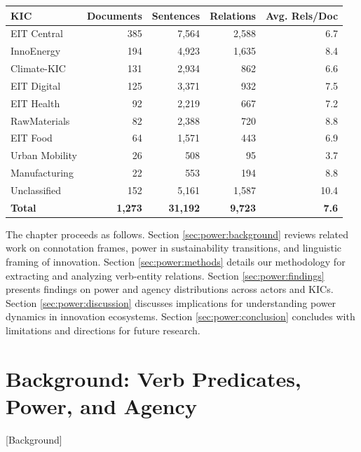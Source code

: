 \documentclass[../main.tex]{subfiles}
\begin{document}
\begin{center}
\small
\begin{tabular}{lrrrr}
\toprule
\textbf{KIC} & \textbf{Documents} & \textbf{Sentences} & \textbf{Relations} & \textbf{Avg. Rels/Doc} \\
\midrule
EIT Central & 385 & 7,564 & 2,588 & 6.7 \\
InnoEnergy & 194 & 4,923 & 1,635 & 8.4 \\
Climate-KIC & 131 & 2,934 & 862 & 6.6 \\
EIT Digital & 125 & 3,371 & 932 & 7.5 \\
EIT Health & 92 & 2,219 & 667 & 7.2 \\
RawMaterials & 82 & 2,388 & 720 & 8.8 \\
EIT Food & 64 & 1,571 & 443 & 6.9 \\
Urban Mobility & 26 & 508 & 95 & 3.7 \\
Manufacturing & 22 & 553 & 194 & 8.8 \\
Unclassified & 152 & 5,161 & 1,587 & 10.4 \\
\midrule
\textbf{Total} & \textbf{1,273} & \textbf{31,192} & \textbf{9,723} & \textbf{7.6} \\
\bottomrule
\end{tabular}
\end{center}

The chapter proceeds as follows. Section \ref{sec:power:background} reviews related work on connotation frames, power in sustainability transitions, and linguistic framing of innovation. Section \ref{sec:power:methods} details our methodology for extracting and analyzing verb-entity relations. Section \ref{sec:power:findings} presents findings on power and agency distributions across actors and KICs. Section \ref{sec:power:discussion} discusses implications for understanding power dynamics in innovation ecosystems. Section \ref{sec:power:conclusion} concludes with limitations and directions for future research.

\section{Background: Verb Predicates, Power, and Agency}[Background]
\end{document}
